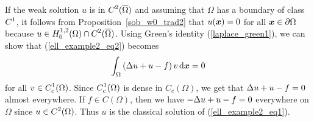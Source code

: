 \begin{egg}
If the weak solution $u$ is in $\displaystyle C^2(\overline{\Omega})$
and assuming that $\Omega$ has a boundary of class
$\displaystyle C^1$, it follows from
Proposition~\ref{sob_w0_trad2} that $u({\bm{x}})=0$ for
all ${\bm{x}}\in \partial \Omega$ because
$\displaystyle u \in H^{1,2}_0(\Omega)\cap C^2(\overline{\Omega})$.
Using Green's identity (\ref{laplace_green1}), we can show
that (\ref{ell_example2_eq2}) becomes
\[
\int_\Omega \left( \Delta u + u - f\right)
v \,\mathrm{d}{{\bm{x}}} = 0
\]
for all $\displaystyle v \in C^1_c(\Omega)$.
Since $\displaystyle C^1_c(\Omega)$ is dense in $C_c(\Omega)$, we
get that $\displaystyle \Delta u + u - f = 0$ almost
everywhere.  If $f \in C(\Omega)$, then we have
$\displaystyle -\Delta u + u -f = 0$ everywhere on $\Omega$ since
$\displaystyle u\in C^2(\Omega)$.  Thus $u$ is the classical solution of
(\ref{ell_example2_eq1}).
\end{egg}


